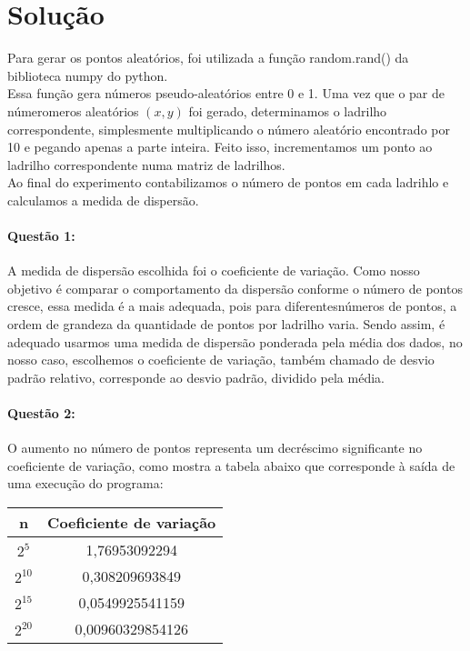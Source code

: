 \documentclass[a4paper,12pt]{article}
\begin{document}
	\section{Solução}
		Para gerar os pontos aleatórios, foi utilizada a função random.rand() da biblioteca numpy do python.\\
		Essa função gera números pseudo-aleatórios entre 0 e 1. Uma vez que o par de númeromeros aleatórios $(x,y)$ foi gerado, determinamos o ladrilho correspondente, simplesmente multiplicando o número aleatório encontrado por 10 e pegando apenas a parte inteira. Feito isso, incrementamos um ponto ao ladrilho correspondente numa matriz de ladrilhos.\\
		Ao final do experimento contabilizamos o número de pontos em cada ladrihlo e calculamos a medida de dispersão.
		\paragraph{Questão 1:} A medida de dispersão escolhida foi o coeficiente de variação. Como nosso objetivo é comparar o comportamento da dispersão conforme o número de pontos cresce, essa medida é a mais adequada, pois para diferentesnúmeros de pontos, a ordem de grandeza da quantidade de pontos por ladrilho varia. Sendo assim, é adequado usarmos uma medida de dispersão ponderada pela média dos dados, no nosso caso, escolhemos o coeficiente de variação, também chamado de desvio padrão relativo, corresponde ao desvio padrão, dividido pela média.
		\paragraph{Questão 2:} O aumento no número de pontos representa um decréscimo significante no coeficiente de variação, como mostra a tabela abaixo que corresponde à saída de uma execução do programa:\\
		\begin{tabular}{c | c}
			n & Coeficiente de variação\\
			\hline
			$2^5$  & 1,76953092294\\			
			$2^10$ & 0,308209693849\\			
			$2^15$ & 0,0549925541159\\			
			$2^20$ & 0,00960329854126\\			
		\end{tabular}
		
\end{document}
